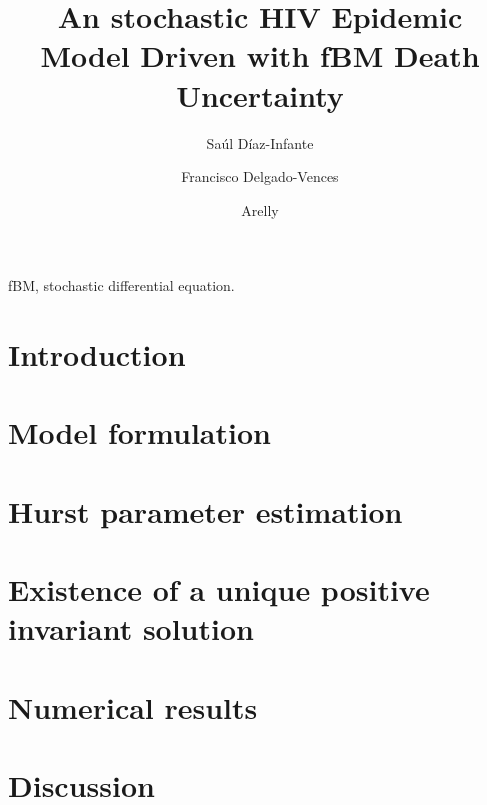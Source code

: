\documentclass[3p,sort&compress,times]{elsarticle}
\DeclareRobustCommand{\1}[1]{\ensuremath \mathbbm{1}_{\{#1\}}}
\begin{document}
  \begin{frontmatter}
     \author[add:conacyt_unison]{%
      Sa\'ul D\'iaz-Infante
    }%
    \author[add:conacyt_unam]{%
      Francisco Delgado-Vences
    }%
    \author[add:institution]{%
      Arelly 
    }%
    \address[add:conacyt_unison]{
      CONACYT-Universidad de Sonora, Departamento de Matem\'aticas, Boulevard
      Luis Encinas y Rosales S/N, Col. Centro, Hermosillo, Sonora, 
      M\'exico.
    }
    \address[add:conacyt_unam]{
      CONACYT-UNAM, Instituto de Matem\'aticas, Sede
      Oaxaca, M\'exico.
    }
  \title{An stochastic HIV Epidemic Model Driven with fBM Death Uncertainty}
  \begin{abstract}
  \end{abstract}%

  \begin{keyword}
    fBM, stochastic differential equation.
  \end{keyword}
\end{frontmatter}
  \section{Introduction} 
    \label{sec:intro}
  \section{Model formulation} 
    \label{sec:model_formulation}
    
  \section{Hurst parameter estimation}
    \label{sec:hurst_parameter}
  \section{Existence of a unique positive invariant solution} 
    \label{sec:existence}
  \section{Numerical results} 
    \label{sec:numerical_results}
  \section{Discussion}
  \nocite{*}
   
  
\end{document}

